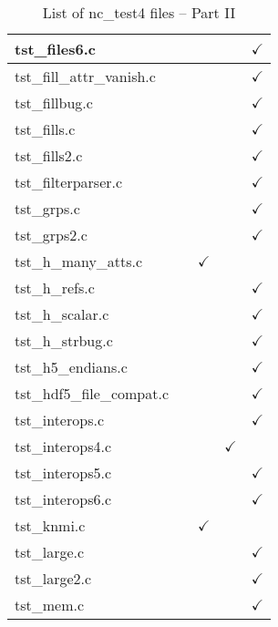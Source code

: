 \begin{table}[H]
\begin{tabular}{|l|c|c|c|c|}
tst\_files6.c   &  &   &   & $\checkmark$    \\ \hline
tst\_fill\_attr\_vanish.c   &  &   &   & $\checkmark$    \\ \hline
tst\_fillbug.c   &  &   &   & $\checkmark$    \\ \hline
tst\_fills.c   &  &   &   & $\checkmark$    \\ \hline
tst\_fills2.c   &  &   &   & $\checkmark$    \\ \hline
tst\_filterparser.c   &  &   &   & $\checkmark$    \\ \hline
tst\_grps.c   &  &   &   & $\checkmark$    \\ \hline
tst\_grps2.c   &  &   &   & $\checkmark$    \\ \hline
tst\_h\_many\_atts.c   &  & $\checkmark$  &   &    \\ \hline
tst\_h\_refs.c   &  &   &   & $\checkmark$    \\ \hline
tst\_h\_scalar.c   &  &   &   & $\checkmark$    \\ \hline
tst\_h\_strbug.c   &  &   &   & $\checkmark$    \\ \hline
tst\_h5\_endians.c   &  &   &   & $\checkmark$    \\ \hline
tst\_hdf5\_file\_compat.c   &  &   &   & $\checkmark$    \\ \hline
tst\_interops.c   &  &   &   & $\checkmark$    \\ \hline
tst\_interops4.c   &  &   &  $\checkmark$ &    \\ \hline
tst\_interops5.c   &  &   &   & $\checkmark$    \\ \hline
tst\_interops6.c   &  &   &   & $\checkmark$    \\ \hline
tst\_knmi.c   &  & $\checkmark$  &   &    \\ \hline
tst\_large.c   &  &   &   & $\checkmark$    \\ \hline
tst\_large2.c   &  &   &   & $\checkmark$    \\ \hline
tst\_mem.c   &  &   &   & $\checkmark$    \\ \hline
\hline
\end{tabular}
\caption{\label{tab:nc_test4_2} List of nc\_test4 files -- Part II}
\end{table}

